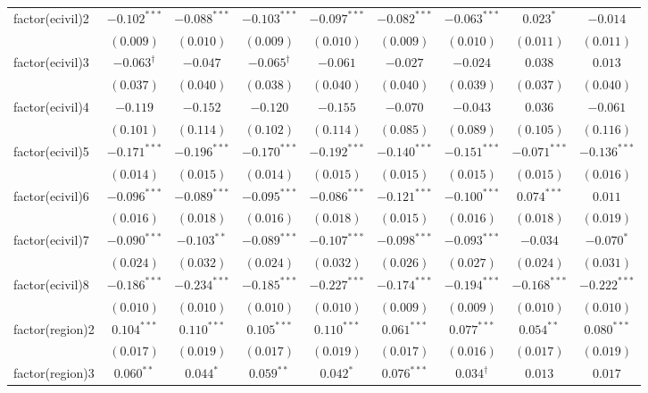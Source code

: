\begin{landscape}
\begin{longtable}{lcccccccc}
factor(ecivil)2 & $-0.102^{***}$ & $-0.088^{***}$ & $-0.103^{***}$ & $-0.097^{***}$ & $-0.082^{***}$ & $-0.063^{***}$ & $0.023^{*}$ & $-0.014$ \\
 & $(0.009)$ & $(0.010)$ & $(0.009)$ & $(0.010)$ & $(0.009)$ & $(0.010)$ & $(0.011)$ & $(0.011)$ \\
factor(ecivil)3 & $-0.063^{\dagger}$ & $-0.047$ & $-0.065^{\dagger}$ & $-0.061$ & $-0.027$ & $-0.024$ & $0.038$ & $0.013$ \\
 & $(0.037)$ & $(0.040)$ & $(0.038)$ & $(0.040)$ & $(0.040)$ & $(0.039)$ & $(0.037)$ & $(0.040)$ \\
factor(ecivil)4 & $-0.119$ & $-0.152$ & $-0.120$ & $-0.155$ & $-0.070$ & $-0.043$ & $0.036$ & $-0.061$ \\
 & $(0.101)$ & $(0.114)$ & $(0.102)$ & $(0.114)$ & $(0.085)$ & $(0.089)$ & $(0.105)$ & $(0.116)$ \\
factor(ecivil)5 & $-0.171^{***}$ & $-0.196^{***}$ & $-0.170^{***}$ & $-0.192^{***}$ & $-0.140^{***}$ & $-0.151^{***}$ & $-0.071^{***}$ & $-0.136^{***}$ \\
 & $(0.014)$ & $(0.015)$ & $(0.014)$ & $(0.015)$ & $(0.015)$ & $(0.015)$ & $(0.015)$ & $(0.016)$ \\
factor(ecivil)6 & $-0.096^{***}$ & $-0.089^{***}$ & $-0.095^{***}$ & $-0.086^{***}$ & $-0.121^{***}$ & $-0.100^{***}$ & $0.074^{***}$ & $0.011$ \\
 & $(0.016)$ & $(0.018)$ & $(0.016)$ & $(0.018)$ & $(0.015)$ & $(0.016)$ & $(0.018)$ & $(0.019)$ \\
factor(ecivil)7 & $-0.090^{***}$ & $-0.103^{**}$ & $-0.089^{***}$ & $-0.107^{***}$ & $-0.098^{***}$ & $-0.093^{***}$ & $-0.034$ & $-0.070^{*}$ \\
 & $(0.024)$ & $(0.032)$ & $(0.024)$ & $(0.032)$ & $(0.026)$ & $(0.027)$ & $(0.024)$ & $(0.031)$ \\
factor(ecivil)8 & $-0.186^{***}$ & $-0.234^{***}$ & $-0.185^{***}$ & $-0.227^{***}$ & $-0.174^{***}$ & $-0.194^{***}$ & $-0.168^{***}$ & $-0.222^{***}$ \\
 & $(0.010)$ & $(0.010)$ & $(0.010)$ & $(0.010)$ & $(0.009)$ & $(0.009)$ & $(0.010)$ & $(0.010)$ \\
factor(region)2 & $0.104^{***}$ & $0.110^{***}$ & $0.105^{***}$ & $0.110^{***}$ & $0.061^{***}$ & $0.077^{***}$ & $0.054^{**}$ & $0.080^{***}$ \\
 & $(0.017)$ & $(0.019)$ & $(0.017)$ & $(0.019)$ & $(0.017)$ & $(0.016)$ & $(0.017)$ & $(0.019)$ \\
factor(region)3 & $0.060^{**}$ & $0.044^{*}$ & $0.059^{**}$ & $0.042^{*}$ & $0.076^{***}$ & $0.034^{\dagger}$ & $0.013$ & $0.017$ \\

\end{longtable}
\end{landscape}

